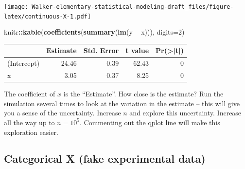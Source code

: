 \documentclass[]{book}
\newenvironment{Shaded}{\begin{snugshade}}{\end{snugshade}}
\newcommand{\KeywordTok}[1]{\textcolor[rgb]{0.13,0.29,0.53}{\textbf{#1}}}
\newcommand{\DataTypeTok}[1]{\textcolor[rgb]{0.13,0.29,0.53}{#1}}
\newcommand{\DecValTok}[1]{\textcolor[rgb]{0.00,0.00,0.81}{#1}}
\newcommand{\StringTok}[1]{\textcolor[rgb]{0.31,0.60,0.02}{#1}}
\newcommand{\OperatorTok}[1]{\textcolor[rgb]{0.81,0.36,0.00}{\textbf{#1}}}
\newcommand{\NormalTok}[1]{#1}
\theoremstyle{definition}
\theoremstyle{definition}
\theoremstyle{definition}
\theoremstyle{remark}
\begin{document}
\texttt{[image: Walker-elementary-statistical-modeling-draft\_files/figure-latex/continuous-X-1.pdf]}

\begin{Shaded}
\begin{Highlighting}[]
\NormalTok{knitr}\OperatorTok{::}\KeywordTok{kable}\NormalTok{(}\KeywordTok{coefficients}\NormalTok{(}\KeywordTok{summary}\NormalTok{(}\KeywordTok{lm}\NormalTok{(y }\OperatorTok{~}\StringTok{ }\NormalTok{x))), }\DataTypeTok{digits=}\DecValTok{2}\NormalTok{)}
\end{Highlighting}
\end{Shaded}

\begin{tabular}{l|r|r|r|r}
\hline
  & Estimate & Std. Error & t value & Pr(>|t|)\\
\hline
(Intercept) & 24.46 & 0.39 & 62.43 & 0\\
\hline
x & 3.05 & 0.37 & 8.25 & 0\\
\hline
\end{tabular}

The coefficient of \(x\) is the ``Estimate''. How close is the estimate?
Run the simulation several times to look at the variation in the
estimate -- this will give you a sense of the uncertainty. Increase
\(n\) and explore this uncertainty. Increase all the way up to
\(n=10^5\). Commenting out the qplot line will make this exploration
easier.

\subsection{Categorical X (fake experimental
data)}\label{categorical-x-fake-experimental-data}
\end{document}
